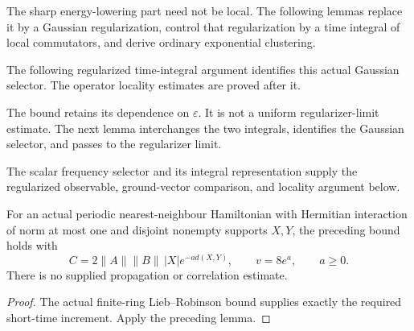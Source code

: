 The sharp energy-lowering part need not be local. The following lemmas
replace it by a Gaussian regularization, control that regularization by a
time integral of local commutators, and derive ordinary exponential
clustering.

The following regularized time-integral argument identifies this actual
Gaussian selector. The operator locality estimates are proved after it.

The bound retains its dependence on $\varepsilon$. It is not a uniform
regularizer-limit estimate. The next lemma interchanges the two integrals,
identifies the Gaussian selector, and passes to the regularizer limit.

The scalar frequency selector and its integral representation supply
the regularized observable, ground-vector comparison, and locality
argument below.

\begin{lemma}
    \label{cor:spt_finite_ring_regularized_frequency_locality}
    \leanok
    For an actual periodic nearest-neighbour Hamiltonian with Hermitian
    interaction of norm at most one and disjoint nonempty supports $X,Y$,
    the preceding bound holds with
    \[
        C=2\|A\|\|B\|\,|X|e^{-a d(X,Y)},
        \qquad v=8e^a,\qquad a\ge0.
    \]
    There is no supplied propagation or correlation estimate.
\end{lemma}
\begin{proof}\leanok
    The actual finite-ring Lieb--Robinson bound supplies exactly the
    required short-time increment. Apply the preceding lemma.
\end{proof}

